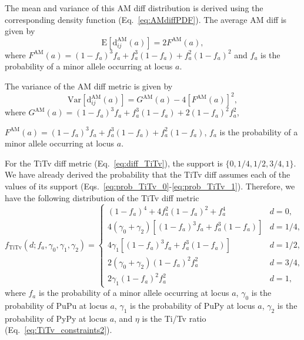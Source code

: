 \documentclass[aos]{imsart}
\begin{document}
The mean and variance of this AM diff distribution is derived using the corresponding density function (Eq.~\ref{eq:AMdiffPDF}). The average AM diff is given by
%
\begin{equation}\label{eq:AMdiffMean}
\text{E}\left[\text{d}^\text{AM}_{ij}(a)\right] = 2 F^\text{AM}(a),
\end{equation}
%
where $F^\text{AM}(a) = \left(1 - f_a\right)^3 f_a + f^3_a \left(1 - f_a\right) + f^2_a \left(1 - f_a\right)^2$ and $f_a$ is the probability of a minor allele occurring at locus $a$.

The variance of the AM diff metric is given by
%
\begin{equation}\label{eq:AMdiffVar}
\text{Var}\left[\text{d}^\text{AM}_{ij}(a)\right] = G^\text{AM}(a) - 4 \left[F^\text{AM}(a)\right]^2,
\end{equation}
%
where $G^\text{AM}(a) = \left(1 - f_a\right)^3 f_a + f^3_a \left(1 - f_a\right) + 2\left(1 - f_a\right)^2 f^2_a$,

\noindent $F^\text{AM}(a) = \left(1 - f_a\right)^3 f_a + f^3_a \left(1 - f_a\right) + f^2_a \left(1 - f_a\right)$, $f_a$ is the probability of a minor allele occurring at locus $a$.

For the TiTv diff metric (Eq.~\ref{eq:diff_TiTv}), the support is $\{0,1/4,1/2,3/4,1\}$. We have already derived the probability that the TiTv diff assumes each of the values of its support (Eqs.~\ref{eq:prob_TiTv_0}-\ref{eq:prob_TiTv_1}). Therefore, we have the following distribution of the TiTv diff metric
%
\begin{equation}\label{eq:TiTvdiffPDF}
f_\text{TiTv}(d;f_a,\gamma_0,\gamma_1,\gamma_2) = \begin{cases}
\left(1 - f_a\right)^4 + 4 f^2_a \left(1 - f_a\right)^2 + f^4_a & d=0, \\
4(\gamma_0 + \gamma_2)\left[\left(1 - f_a\right)^3 f_a + f^3_a \left(1 - f_a\right)\right] & d=1/4, \\
4 \gamma_1 \left[\left(1 - f_a\right)^3 f_a + f^3_a \left(1 - f_a\right)\right] & d=1/2, \\
2(\gamma_0 + \gamma_2)\left(1 - f_a\right)^2 f^2_a & d=3/4, \\
2\gamma_1\left(1 - f_a\right)^2 f^2_a & d=1,
\end{cases}
\end{equation}
%
where $f_a$ is the probability of a minor allele occurring at locus $a$, $\gamma_0$ is the probability of PuPu at locus $a$, $\gamma_1$ is the probability of PuPy at locus $a$, $\gamma_2$ is the probability of PyPy at locus $a$, and $\eta$ is the Ti/Tv ratio (Eq.~\ref{eq:TiTv_constraints2}).
\end{document}
